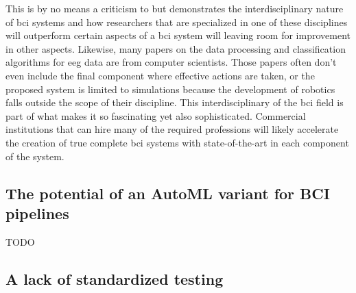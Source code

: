 This is by no means a criticism to \citet{complex_hand_few_classes} but demonstrates the interdisciplinary nature of \gls{bci} systems and how researchers that are specialized in one of these disciplines will outperform certain aspects of a \gls{bci} system will leaving room for improvement in other aspects.
Likewise, many papers on the data processing and classification algorithms for \gls{eeg} data are from computer scientists.
Those papers often don't even include the final component where effective actions are taken, or the proposed system is limited to simulations because the development of robotics falls outside the scope of their discipline.
This interdisciplinary of the \gls{bci} field is part of what makes it so fascinating yet also sophisticated.
Commercial institutions that can hire many of the required professions will likely accelerate the creation of true complete \gls{bci} systems with state-of-the-art in each component of the system.



\subsection{The potential of an AutoML variant for BCI pipelines}
\label{subsec:bci_opportunities_obstacles_automl}


TODO


\subsection{A lack of standardized testing}
\label{subsec:bci_opportunities_obstacles_lack_of_testing}

